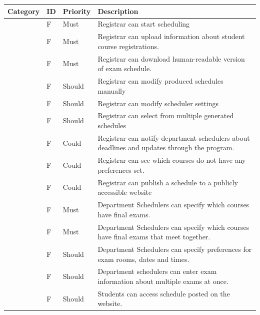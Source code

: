 \documentclass[11pt]{article}
\newcounter{id}
\newcommand{\specid}{\arabic{id}\stepcounter{id}}
\begin{document}
\begin{longtable}{|m{1in}|m{0.3in}|m{0.6in}|m{4.5in}|}
\hline
\textbf{Category}  & \textbf{ID}  & \textbf{Priority}        & \textbf{Description} \\
\hline\hline
\endhead

\hline
\endfoot
\multirow{16}{*}{Functionality }
 &F\specid & Must
 & Registrar can start scheduling \\  \cline{2-4}
 & F\specid & Must
 & Registrar can upload information about student course registrations. \\  \cline{2-4}
 & F\specid & Must
 & Registrar can download human-readable version of exam schedule. \\  \cline{2-4}
 & F\specid & Should
 & Registrar can modify produced schedules manually \\  \cline{2-4}
 & F\specid & Should
 & Registrar can modify scheduler settings \\ \cline{2-4}
 & F\specid & Should
 & Registrar can select from multiple generated schedules \\  \cline{2-4}
 & F\specid & Could
 & Registrar can notify department schedulers about deadlines and updates through the program. \\  \cline{2-4}
 & F\specid & Could
 & Registrar can see which courses do not have any preferences set. \\  \cline{2-4}
 & F\specid & Could
 & Registrar can publish a schedule to a publicly accessible website  \\  \cline{2-4}
 & F\specid & Must
 &Department Schedulers can specify which courses have final exams. \\  \cline{2-4}
 & F\specid & Must
 &Department Schedulers can specify which courses have final exams that meet together. \\  \cline{2-4}
 & F\specid & Should
 &Department Schedulers can specify preferences  for exam rooms, dates and times.\\  \cline{2-4}
 &F\specid & Should
 & Department schedulers can enter exam information about multiple exams at once.  \\  \cline{2-4}

 & F\specid & Should
 &  Students can access schedule posted on the website.\\  \hline\hline


\end{longtable}
\end{document}

